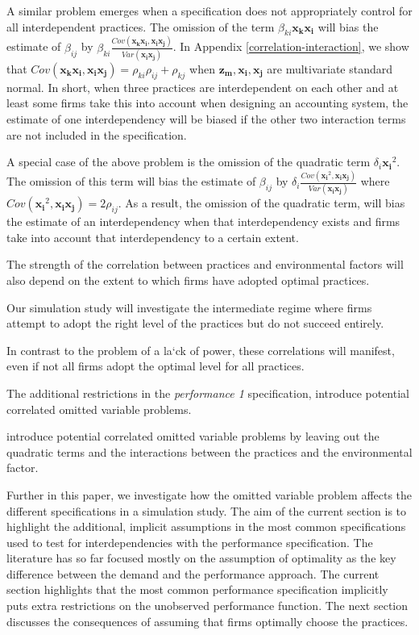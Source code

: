 \documentclass[12pt]{article}
\begin{document}
A similar problem emerges when a specification does not appropriately control for all interdependent practices. The omission of the term $\beta_{ki} \mathbf{x_k} \mathbf{x_i}$ will bias the estimate of $\beta_{ij}$ by $\beta_{ki} \frac{Cov(\mathbf{x_k} \mathbf{x_i}, \mathbf{x_i} \mathbf{x_j})}{Var (\mathbf{x_i x_j})}$. In Appendix \ref{correlation-interaction}, we show that $Cov(\mathbf{x_k} \mathbf{x_i}, \mathbf{x_i} \mathbf{x_j}) = \rho_{ki} \rho_{ij} + \rho_{kj}$ when $\mathbf{z_m}, \mathbf{x_i}, \mathbf{x_j}$ are multivariate standard normal. In short, when three practices are interdependent on each other and at least some firms take this into account when designing an accounting system, the estimate of one interdependency will be biased if the other two interaction terms are not included in the specification. 

A special case of the above problem is the omission of the quadratic term $\delta_i \mathbf{x_i}^2$. The omission of this term will bias the estimate of $\beta_{ij}$ by $\delta_i \frac{Cov(\mathbf{x_i}^2, \mathbf{x_i} \mathbf{x_j})}{Var (\mathbf{x_i x_j})}$ where $Cov(\mathbf{x_i}^2, \mathbf{x_i} \mathbf{x_j}) = 2 \rho_{ij}$. As a result, the omission of the quadratic term, will bias the estimate of an interdependency when that interdependency exists and firms take into account that interdependency to a certain extent. 


The strength of the correlation between practices and environmental factors will also depend on the extent to which firms have adopted optimal practices. 

Our simulation study will investigate the intermediate regime where firms attempt to adopt the right level of the practices but do not succeed entirely.

In contrast to the problem of a la`ck of power, these correlations will manifest, even if not all firms adopt the optimal level for all practices. 


The additional restrictions in the \emph{performance 1} specification, introduce potential correlated omitted variable problems.  

introduce potential correlated omitted variable problems by leaving out
the quadratic terms and the interactions between the practices and the
environmental factor. 

Further in this paper, we investigate how the omitted variable problem
affects the different specifications in a simulation study. The aim of
the current section is to highlight the additional, implicit assumptions
in the most common specifications used to test for interdependencies
with the performance specification. The literature has so far focused
mostly on the assumption of optimality as the key difference between the
demand and the performance approach. The current section highlights that
the most common performance specification implicitly puts extra
restrictions on the unobserved performance function. The next section
discusses the consequences of assuming that firms optimally choose the
practices.
\end{document}
